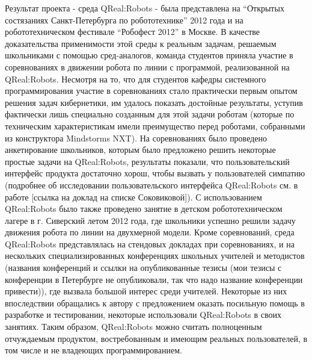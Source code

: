 	Результат проекта - среда QReal:Robots - была представлена на “Открытых состязаниях Санкт-Петербурга по робототехнике” 2012 года и на робототехническом фестивале “Робофест 2012” в Москве. В качестве доказательства применимости этой среды к реальным задачам, решаемым школьниками с помощью сред-аналогов, команда студентов приняла участие в соревнованиях в движении робота по линии с программой, реализованной на QReal:Robots. Несмотря на то, что для студентов кафедры системного программирования участие в соревнованиях стало практически первым опытом решения задач кибернетики, им удалось показать достойные результаты, уступив фактически лишь специально созданным для этой задачи роботам (которые по техническим характеристикам имели преимущество перед роботами, собранными из конструктора Mindstorms NXT). На соревнованиях было проведено анкетирование школьников, которым было предложено решить некоторые простые задачи на QReal:Robots, результаты показали, что пользовательский интерфейс продукта достаточно хорош, чтобы вызвать у пользователей симпатию (подробнее об исследовании пользовательского интерфейса QReal:Robots см. в работе [ссылка на доклад на списке Соковиковой]). С использованием QReal:Robots было также проведено занятие в детском робототехническом лагере в г. Сиверский летом 2012 года, где школьники успешно решили задачу движения робота по линии на двухмерной модели.
	Кроме соревнований, среда QReal:Robots представлялась на стендовых докладах при соревнованиях, и на нескольких специализированных конференциях школьных учителей и методистов (названия конференций и ссылки на опубликованные тезисы (мои тезисы с конференции в Петербурге не опубликовали, так что надо название конференции привести)), где вызвала большой интерес среди учителей. Некоторые из них впоследствии обращались к автору с предложением оказать посильную помощь в разработке и тестировании, некоторые использовали QReal:Robots в своих занятиях. Таким образом, QReal:Robots можно считать полноценным отчуждаемым продуктом, востребованным и имеющим реальных пользователей, в том числе и не владеющих программированием.
